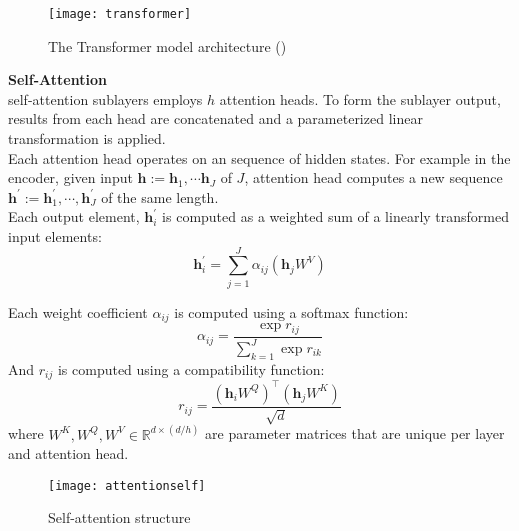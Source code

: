 \begin{figure}[t]
	\centering
	\texttt{[image: transformer]}
	\caption{The Transformer model architecture (\cite{vaswani2017attention})}
\end{figure}
%
%
\textbf{Self-Attention}\\
self-attention sublayers employs $h$ attention heads. To form the sublayer output, results from each head are concatenated and a parameterized linear transformation is applied.\\
Each attention head operates on an sequence of hidden states. For example in the encoder, given input $\bm{h}:=\bm{h}_1, \cdots \bm{h}_J$ of $J$, attention head computes a new sequence $\bm{h}^{\prime}:= \bm{h}_1^{\prime}, \cdots, \bm{h}_J^{\prime}$ of the same length.\\
Each output element, $\bm{h}_i^{\prime}$ is computed as a weighted sum of a linearly transformed input elements:
\[ \bm{h}_i^{\prime} = \sum_{j=1}^{J} \alpha_{ij}(\bm{h}_{j}W^V) \]

Each weight coefficient $\alpha_{ij}$ is computed using a softmax function:
\[\alpha_{ij} = \frac{\exp {r_{ij}}}{\sum_{k=1}^{J} \exp  {r_{ik}}}\]
And $r_{ij}$ is computed using a compatibility function:
\[r_{ij} = \frac{(\bm{h}_iW^Q)^{\top}(\bm{h}_jW^K)}{\sqrt{d}} \]
where $W^K,W^Q,W^V \in \mathbb{R}^{d \times (d/h)}$ are parameter matrices that are unique per layer and attention head.
\begin{figure}[h]
	\centering
	\texttt{[image: attentionself]}
	\caption{Self-attention structure}
\end{figure}


